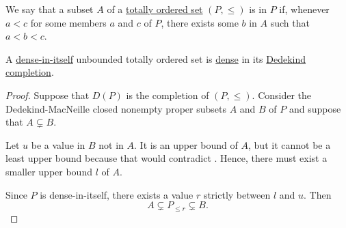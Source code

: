 \begin{definition}\label{def:dense_total_order}
  We say that a subset \( A \) of a \hyperref[def:totally_ordered_set]{totally ordered set} \( (P, \leq) \) is  in \( P \) if, whenever \( a < c \) for some members \( a \) and \( c \) of \( P \), there exists some \( b \) in \( A \) such that \( a < b < c \).
\end{definition}

\begin{proposition}\label{thm:dedekind_completion_dense}
  A \hyperref[def:dense_total_order]{dense-in-itself} unbounded totally ordered set is \hyperref[def:dense_total_order]{dense} in its \hyperref[def:dedekind_completion]{Dedekind completion}.
\end{proposition}
\begin{proof}
  Suppose that \( D(P) \) is the completion of \( (P, \leq) \). Consider the Dedekind-MacNeille closed nonempty proper subsets \( A \) and \( B \) of \( P \) and suppose that \( A \subsetneq B \).

  Let \( u \) be a value in \( B \) not in \( A \). It is an upper bound of \( A \), but it cannot be a least upper bound because that would contradict . Hence, there must exist a smaller upper bound \( l \) of \( A \).

  Since \( P \) is dense-in-itself, there exists a value \( r \) strictly between \( l \) and \( u \). Then
  \begin{equation*}
    A \subsetneq P_{\leq r} \subsetneq B.
  \end{equation*}
\end{proof}
